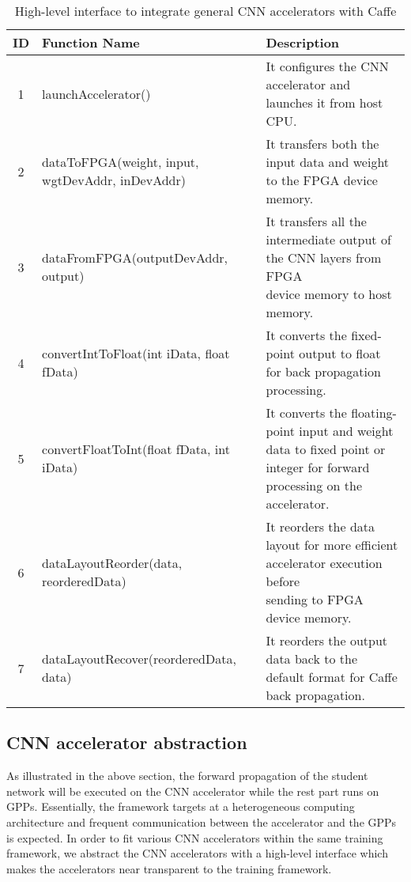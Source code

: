 \begin{table*}
        \centering
        \vspace{-0.3em}
        \caption{High-level interface to integrate general CNN accelerators with Caffe}
        \label{tab:api}
        \vspace{-0.3em}
        \begin{tabular}{c|l|l}
                \toprule
                ID & Function Name & Description  \\
                \midrule
                1 & launchAccelerator() & It configures the CNN accelerator and launches it from host CPU. \\
		\midrule
                2 & dataToFPGA(weight, input, wgtDevAddr, inDevAddr) & It transfers both the input data and weight to the FPGA device memory. \\
		\midrule
		3 & dataFromFPGA(outputDevAddr, output) & \shortstack[l]{It transfers all the intermediate output of the CNN layers from FPGA \\device memory to host memory.} \\
		\midrule
		4 & convertIntToFloat(int iData, float fData) & It converts the fixed-point output to float for back propagation processing. \\
		\midrule
		5 & convertFloatToInt(float fData,  int iData) & \shortstack[l]{It converts the floating-point input and weight data to fixed point or \\integer for forward processing on the accelerator.} \\
		\midrule
		6 & dataLayoutReorder(data, reorderedData) & \shortstack[l]{It reorders the data layout for more efficient accelerator execution before \\sending to FPGA device memory.} \\
		\midrule
		7 & dataLayoutRecover(reorderedData, data) & It reorders the output data back to the default format for Caffe back propagation. \\
                \bottomrule
        \end{tabular}
        \vspace{-1em}
\end{table*}



\subsection{CNN accelerator abstraction}
As illustrated in the above section, the forward propagation of the 
student network will be executed on the CNN accelerator while 
the rest part runs on GPPs. Essentially, the framework targets at a 
heterogeneous computing architecture and frequent 
communication between the accelerator and the GPPs is expected. 
In order to fit various CNN accelerators within the same training framework,
we abstract the CNN accelerators with a high-level interface
which makes the accelerators near transparent to the training framework.

